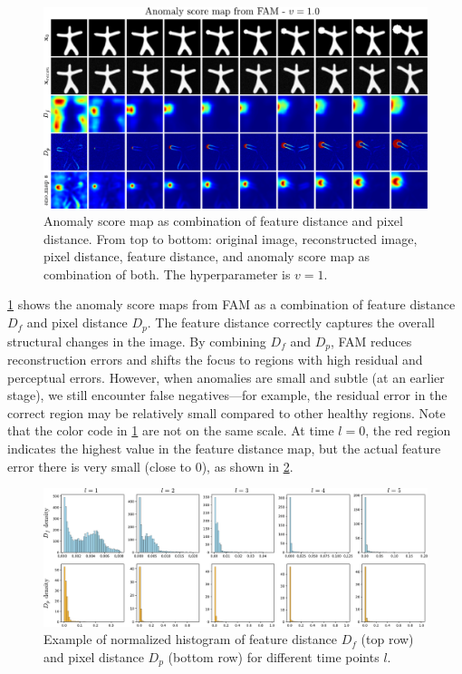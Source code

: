 \begin{figure}[h]
    \centering
    \includegraphics[width=0.75\linewidth]{figures/ano-score-map-gcircle.pdf}
    \caption[Anomaly score map from FAM]{Anomaly score map as combination of feature distance and pixel distance. From top to bottom: original image, reconstructed image, pixel distance, feature distance, and anomaly score map as combination of both. The hyperparameter is $v=1$.}
    \label{fig:ano-score-map-gcircle}
\end{figure}

\cref{fig:ano-score-map-gcircle} shows the anomaly score maps from \ac{FAM} as a combination of feature distance $D_f$ and pixel distance $D_p$. The feature distance correctly captures the overall structural changes in the image. By combining $D_f$ and $D_p$, \ac{FAM} reduces reconstruction errors and shifts the focus to regions with high residual and perceptual errors. However, when anomalies are small and subtle (at an earlier stage), we still encounter false negatives—for example, the residual error in the correct region may be relatively small compared to other healthy regions. Note that the color code in \cref{fig:ano-score-map-gcircle} are not on the same scale. At time $l=0$, the red region indicates the highest value in the feature distance map, but the actual feature error there is very small (close to 0), as shown in \cref{fig:hist-fd-id-gcircle}.

\begin{figure}[h]
    \centering
    \includegraphics[width=0.75\linewidth]{figures/hist-fd-id-gcircle.pdf}
    \caption[Example of normalized histogram of $D_f$ and $D_p$]{Example of normalized histogram of feature distance $D_f$ (top row) and pixel distance $D_p$ (bottom row) for different time points $l$. }
    \label{fig:hist-fd-id-gcircle}
\end{figure}

